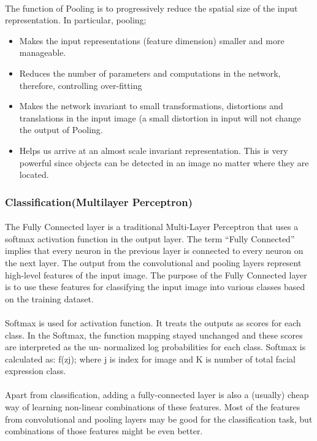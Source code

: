 \documentclass[a4paper,12pt,oneside]{article}
\begin{document}
\paragraph{}
﻿The function of Pooling is to progressively reduce the spatial size of the input representation.
In particular, pooling;
\begin{itemize}
	\item ﻿Makes the input representations (feature dimension) smaller and more manageable.
	\item ﻿Reduces the number of parameters and computations in the network, therefore,
controlling over-fitting
	\item ﻿Makes the network invariant to small transformations, distortions and translations in
the input image (a small distortion in input will not change the output of Pooling.
	\item ﻿Helps us arrive at an almost scale invariant representation. This is very powerful since
objects can be detected in an image no matter where they are located.
\end{itemize}

\subsubsection{﻿Classification(Multilayer Perceptron)}
\paragraph{}
﻿The Fully Connected layer is a traditional Multi-Layer Perceptron that uses a softmax
activation function in the output layer. The term “Fully Connected” implies that every neuron
in the previous layer is connected to every neuron on the next layer. The output from the
convolutional and pooling layers represent high-level features of the input image. The purpose
of the Fully Connected layer is to use these features for classifying the input image into various
classes based on the training dataset.
\paragraph{}
﻿Softmax is used for activation function. It treats the outputs as scores for each class. In the
Softmax, the function mapping stayed unchanged and these scores are interpreted as the un-
normalized log probabilities for each class. Softmax is calculated as: f(zj); ﻿where j is index for image and K is number of total facial expression class.
\paragraph{}
﻿Apart from classification, adding a fully-connected layer is also a (usually) cheap way of
learning non-linear combinations of these features. Most of the features from convolutional
and pooling layers may be good for the classification task, but combinations of those features
might be even better.
\end{document}

